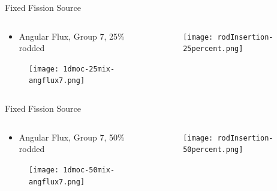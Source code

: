 
\begin{frame}[t]{Fixed Fission Source}

\begin{columns}
    \begin{column}{0.6\textwidth}
\begin{itemize}
  \item Angular Flux, Group 7, 25\% rodded
\end{itemize}
\begin{figure}[H]
    \centering
    \texttt{[image: 1dmoc-25mix-angflux7.png]}
\end{figure}
\end{column}
\begin{column}{0.4\textwidth}
\begin{figure}[H]
    \centering
    \texttt{[image: rodInsertion-25percent.png]}
\end{figure}
\end{column}
\end{columns}

\end{frame}


\begin{frame}[t]{Fixed Fission Source}

\begin{columns}
    \begin{column}{0.6\textwidth}
        \begin{itemize}
            \item Angular Flux, Group 7, 50\% rodded
        \end{itemize}
        \begin{figure}[H]
            \centering
            \texttt{[image: 1dmoc-50mix-angflux7.png]}
        \end{figure}
    \end{column}
    \begin{column}{0.4\textwidth}
        \begin{figure}[H]
            \centering
            \texttt{[image: rodInsertion-50percent.png]}
        \end{figure}
    \end{column}
\end{columns}

\end{frame}

